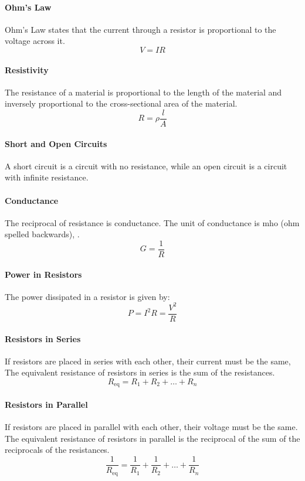 \documentclass[11pt]{article}
\begin{document}
\paragraph{Ohm's Law} Ohm's Law states that the current through a resistor is proportional to the voltage across it.
\begin{equation}
    V = IR
\end{equation}
\paragraph{Resistivity} The resistance of a material is proportional to the length of the material and inversely proportional to the cross-sectional area of the material.
\begin{equation}
    R = \rho \frac{l}{A}
\end{equation}
\paragraph{Short and Open Circuits} A short circuit is a circuit with no resistance, while an open circuit is a circuit with infinite resistance.
\paragraph{Conductance} The reciprocal of resistance is conductance. The unit of conductance is mho (ohm spelled backwards), .
\begin{equation}
    G = \frac{1}{R}
\end{equation}
\paragraph{Power in Resistors} The power dissipated in a resistor is given by:
\begin{equation}
    P = I^2R = \frac{V^2}{R}
\end{equation}
\paragraph{Resistors in Series} If resistors are placed in series with each other, their current must be the same, The equivalent resistance of resistors in series is the sum of the resistances.
\begin{equation}
    R_{\text{eq}} = R_1 + R_2 + \dots + R_n
\end{equation}
\paragraph{Resistors in Parallel} If resistors are placed in parallel with each other, their voltage must be the same. The equivalent resistance of resistors in parallel is the reciprocal of the sum of the reciprocals of the resistances.
\begin{equation}
    \frac{1}{R_{\text{eq}}} = \frac{1}{R_1} + \frac{1}{R_2} + \dots + \frac{1}{R_n}
\end{equation}
\end{document}
